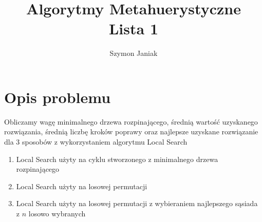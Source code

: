 \documentclass{article}
\title{%
	Algorytmy Metahuerystyczne \\
	\large Lista 1}
\author{Szymon Janiak}
\begin{document}
\maketitle

\sectionfont{\centering}
\subsectionfont{\centering}
\section*{Opis problemu}
	Obliczamy wagę minimalnego drzewa rozpinającego, średnią wartość uzyskanego rozwiązania, średnią liczbę kroków poprawy oraz najlepsze uzyskane rozwiązanie dla 3 sposobów z wykorzystaniem algorytmu Local Search
	\begin{enumerate}
	    \item Local Search użyty na cyklu stworzonego z minimalnego drzewa rozpinającego
	    \item Local Search użyty na losowej permutacji
	    \item Local Search użyty na losowej permutacji z wybieraniem najlepszego sąsiada z $n$ losowo wybranych
	\end{enumerate}
\end{document}
